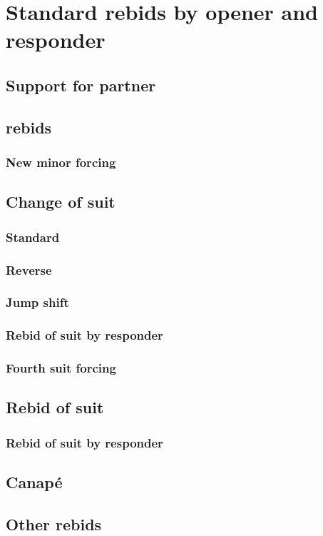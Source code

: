 \chapter{Standard rebids by opener and responder}
\label{ch:standard_rebids}

\section{Support for partner}

\section{\bNs rebids}

\subsection{New minor forcing}

\section{Change of suit}

\subsection{Standard}

\subsection{Reverse}

\subsection{Jump shift}

\subsection{Rebid of suit by responder}

\subsection{Fourth suit forcing}

\section{Rebid of suit}

\subsection{Rebid of suit by responder}

\section{Canapé}
\label{sec:canape}

\section{Other rebids}

